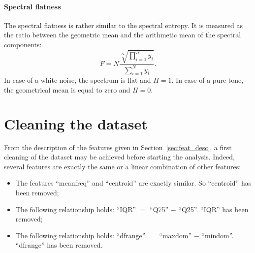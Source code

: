 \paragraph{Spectral flatness}
The spectral flatness is rather similar to the spectral entropy. It is measured as the ratio between the geometric mean and the arithmetic mean of the spectral components:
\begin{equation}
\label{eq:spec_flat}
	F = N \frac{\sqrt[N]{\prod\limits_{i=1}^{N} y_i}}{\sum \limits_{i=1}^{N} y_i}.
\end{equation}
In case of a white noise, the spectrum is flat and $H=1$. In case of a pure tone, the geometrical mean is equal to zero and $H=0$.

\section{Cleaning the dataset}
\label{sec_cleaning_dataset}
From the description of the features given in Section~\ref{sec:feat_desc}, a first cleaning of the dataset may be achieved before starting the analysis.
Indeed, several features are exactly the same or a linear combination of other features:
\begin{itemize}
	\item The features ``meanfreq'' and ``centroid'' are exactly similar. So ``centroid'' has been removed;
	\item The following relationship holds: ``IQR'' $=$ ``Q75'' $-$ ``Q25''. ``IQR'' has been removed;
	\item The following relationship holds: ``dfrange'' $=$ ``maxdom'' $-$ ``mindom''. ``dfrange'' has been removed.
\end{itemize}